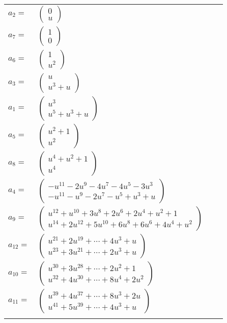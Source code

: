 \documentclass[1p]{elsarticle_modified}
\theoremstyle{definition}
\begin{document}
\begin{tabular}{m{7pt} m{180pt} m{7pt} m{180pt} }
\flushright $a_{2}=$&$\begin{pmatrix}0\\u\end{pmatrix}$ \\
\flushright $a_{7}=$&$\begin{pmatrix}1\\0\end{pmatrix}$ \\
\flushright $a_{6}=$&$\begin{pmatrix}1\\u^2\end{pmatrix}$ \\
\flushright $a_{3}=$&$\begin{pmatrix}u\\u^3+u\end{pmatrix}$ \\
\flushright $a_{1}=$&$\begin{pmatrix}u^3\\u^5+u^3+u\end{pmatrix}$ \\
\flushright $a_{5}=$&$\begin{pmatrix}u^2+1\\u^2\end{pmatrix}$ \\
\flushright $a_{8}=$&$\begin{pmatrix}u^4+u^2+1\\u^4\end{pmatrix}$ \\
\flushright $a_{4}=$&$\begin{pmatrix}- u^{11}-2 u^9-4 u^7-4 u^5-3 u^3\\- u^{11}- u^9-2 u^7- u^5+u^3+u\end{pmatrix}$ \\
\flushright $a_{9}=$&$\begin{pmatrix}u^{12}+u^{10}+3 u^8+2 u^6+2 u^4+u^2+1\\u^{14}+2 u^{12}+5 u^{10}+6 u^8+6 u^6+4 u^4+u^2\end{pmatrix}$ \\
\flushright $a_{12}=$&$\begin{pmatrix}u^{21}+2 u^{19}+\cdots+4 u^3+u\\u^{23}+3 u^{21}+\cdots+2 u^3+u\end{pmatrix}$ \\
\flushright $a_{10}=$&$\begin{pmatrix}u^{30}+3 u^{28}+\cdots+2 u^2+1\\u^{32}+4 u^{30}+\cdots+8 u^4+2 u^2\end{pmatrix}$ \\
\flushright $a_{11}=$&$\begin{pmatrix}u^{39}+4 u^{37}+\cdots+8 u^3+2 u\\u^{41}+5 u^{39}+\cdots+4 u^3+u\end{pmatrix}$\\&\end{tabular}
\end{document}
